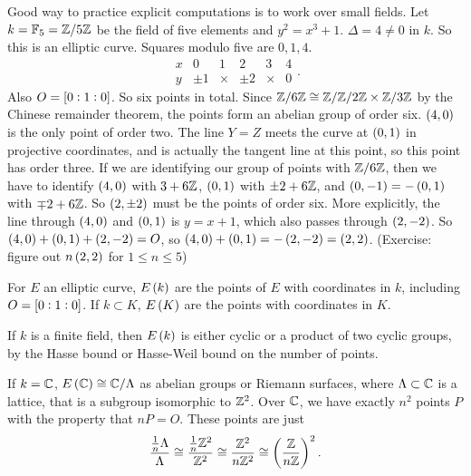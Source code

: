 \begin{example*}
Good way to practice explicit computations is to work over small fields. Let $ k = \mathbb{F}_5 = \mathbb{Z} / 5\mathbb{Z} $ be the field of five elements and $ y^2 = x^3 + 1 $. $ \Delta = 4 \ne 0 $ in $ k $. So this is an elliptic curve. Squares modulo five are $ 0, 1, 4 $.
$$
\begin{array}{c|ccccc}
x & 0 & 1 & 2 & 3 & 4 \\
\hline
y & \pm 1 & \times & \pm 2 & \times & 0
\end{array}.
$$
Also $ O = \sbr{0 : 1 : 0} $. So six points in total. Since $ \mathbb{Z} / 6\mathbb{Z} \cong \mathbb{Z} / \mathbb{Z} / 2\mathbb{Z} \times \mathbb{Z} / 3\mathbb{Z} $ by the Chinese remainder theorem, the points form an abelian group of order six. $ \br{4, 0} $ is the only point of order two. The line $ Y = Z $ meets the curve at $ \br{0, 1} $ in projective coordinates, and is actually the tangent line at this point, so this point has order three. If we are identifying our group of points with $ \mathbb{Z} / 6\mathbb{Z} $, then we have to identify $ \br{4, 0} $ with $ 3 + 6\mathbb{Z} $, $ \br{0, 1} $ with $ \pm 2 + 6\mathbb{Z} $, and $ \br{0, -1} = -\br{0, 1} $ with $ \mp 2 + 6\mathbb{Z} $. So $ \br{2, \pm 2} $ must be the points of order six. More explicitly, the line through $ \br{4, 0} $ and $ \br{0, 1} $ is $ y = x + 1 $, which also passes through $ \br{2, -2} $. So $ \br{4, 0} + \br{0, 1} + \br{2, -2} = O $, so $ \br{4, 0} + \br{0, 1} = -\br{2, -2} = \br{2, 2} $. (Exercise: figure out $ n\br{2, 2} $ for $ 1 \le n \le 5 $)
\end{example*}

For $ E $ an elliptic curve, $ E\br{k} $ are the points of $ E $ with coordinates in $ k $, including $ O = \sbr{0 : 1 : 0} $. If $ k \subset K $, $ E\br{K} $ are the points with coordinates in $ K $.

\begin{example*}
If $ k $ is a finite field, then $ E\br{k} $ is either cyclic or a product of two cyclic groups, by the Hasse bound or Hasse-Weil bound on the number of points.
\end{example*}

\begin{example*}
If $ k = \mathbb{C} $, $ E\br{\C} \cong \C / \Lambda $ as abelian groups or Riemann surfaces, where $ \Lambda \subset \mathbb{C} $ is a lattice, that is a subgroup isomorphic to $ \mathbb{Z}^2 $. Over $ \mathbb{C} $, we have exactly $ n^2 $ points $ P $ with the property that $ nP = O $. These points are just
$$ \dfrac{\tfrac{1}{n}\Lambda}{\Lambda} \cong \dfrac{\tfrac{1}{n}\Z^2}{\Z^2} \cong \dfrac{\Z^2}{n\Z^2} \cong \br{\dfrac{\Z}{n\Z}}^2. $$
\end{example*}

